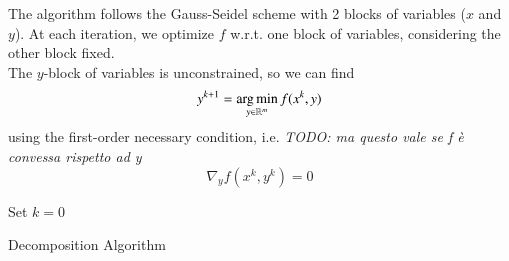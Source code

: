 The algorithm follows the Gauss-Seidel scheme with 2 blocks of variables ($x$ and $y$). At each iteration, we optimize $f$ w.r.t. one block of variables, considering the other block fixed. \\
The $y$-block of variables is unconstrained, so we can find
\begin{equation}\label{eq:updatey}
y^{k+1} = \operatorname*{arg\,min}_{y \in \mathbb{R}^m} f(x^{k},y)
\end{equation}
using the first-order necessary condition, i.e. \textit{TODO: ma questo vale se f è convessa rispetto ad y}
\begin{equation}
\nabla_y f(x^{k}, y^{k}) = 0
\end{equation}

\begin{algorithm}
 Set $k = 0$\\
 \caption{Decomposition Algorithm}
\end{algorithm}
